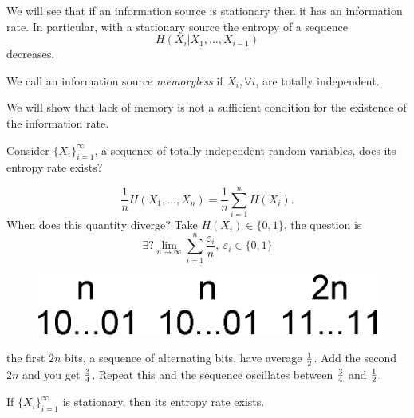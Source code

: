 We will see that if an information source is stationary then it has an information rate. In particular, with a stationary source the entropy of a sequence $$H(X_i | X_1, \ldots, X_{i-1})$$ decreases.
\begin{definition}
We call an information source \emph{memoryless} if $X_i, \forall i$, are totally independent.  
\end{definition}
We will show that lack of memory is not a sufficient condition for the existence of the information rate.

Consider $\{X_i\}_{i = 1}^\infty$, a sequence of totally independent random variables, does its entropy rate exists?

\begin{equation}
 \dfrac{1}{n}H(X_1, \ldots, X_n) = \dfrac{1}{n}\sum_{i=1}^nH(X_i).
\end{equation}
When does this quantity diverge? Take $H(X_i) \in \{0, 1\}$, the question is
\[ 
\exists? \lim_{n\rightarrow \infty} \sum_{i = 1}^n \dfrac{\varepsilon_i}{n},\ \varepsilon_i \in \{0, 1\}
\]

\begin{figure}[h!]
\centering
	\includegraphics[width=0.3\linewidth]{pictures/ch05-seq.eps}
\end{figure}
the first $2n$ bits, a sequence of alternating bits, have average $\frac{1}{2}$. Add the second $2n$ and you get $\frac{3}{4}$. Repeat this and the sequence oscillates between $\frac{3}{4}$ and $\frac{1}{2}$.

\begin{thm}
 If $\{X_i\}_{i = 1}^\infty$ is stationary, then its entropy rate exists.
\end{thm}

